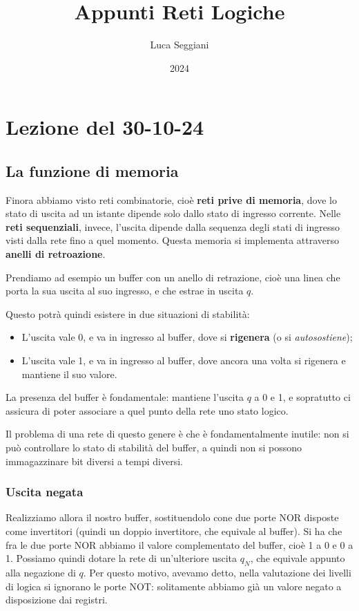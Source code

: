 \documentclass[a4paper,11pt]{article}
\title{Appunti Reti Logiche}
\author{Luca Seggiani}
\date{2024}
\begin{document}
\section{Lezione del 30-10-24}

\thispagestyle{empty}
\pagestyle{fancy}

\subsection{La funzione di memoria}
Finora abbiamo visto reti combinatorie, cioè \textbf{reti prive di memoria}, dove lo stato di uscita ad un istante dipende solo dallo stato di ingresso corrente.
Nelle \textbf{reti sequenziali}, invece, l'uscita dipende dalla sequenza degli stati di ingresso visti dalla rete fino a quel momento. 
Questa memoria si implementa attraverso \textbf{anelli di retroazione}.

Prendiamo ad esempio un buffer con un anello di retrazione, cioè una linea che porta la sua uscita al suo ingresso, e che estrae in uscita $q$.

Questo potrà quindi esistere in due situazioni di stabilità:
\begin{itemize}
	\item L'uscita vale 0, e va in ingresso al buffer, dove si \textbf{rigenera} (o si \textit{autosostiene});
	\item L'uscita vale 1, e va in ingresso al buffer, dove ancora una volta si rigenera e mantiene il suo valore.
\end{itemize}

La presenza del buffer è fondamentale: mantiene l'uscita $q$ a 0 e 1, e sopratutto ci assicura di poter associare a quel punto della rete uno stato logico.

Il problema di una rete di questo genere è che è fondamentalmente inutile: non si può controllare lo stato di stabilità del buffer, a quindi non si possono immagazzinare bit diversi a tempi diversi.

\subsubsection{Uscita negata}
Realizziamo allora il nostro buffer, sostituendolo cone due porte NOR disposte come invertitori (quindi un doppio invertitore, che equivale al buffer).
Si ha che fra le due porte NOR abbiamo il valore complementato del buffer, cioè 1 a 0 e 0 a 1.
Possiamo quindi dotare la rete di un'ulteriore uscita $q_N$, che equivale appunto alla negazione di $q$.
Per questo motivo, avevamo detto, nella valutazione dei livelli di logica si ignorano le porte NOT: solitamente abbiamo già un valore negato a disposizione dai registri.
\end{document}
